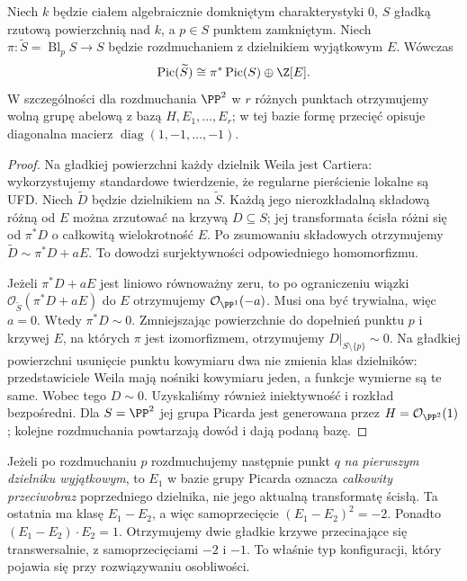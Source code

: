 \begin{stwierdzenie}
\label{st:ga6-pic-blowup}
Niech $k$ będzie ciałem algebraicznie domkniętym
charakterystyki $0$, $S$ gładką rzutową powierzchnią
nad $k$, a $p\in S$ punktem zamkniętym.
Niech $\pi:\widetilde S=\operatorname{Bl}_pS\to S$
będzie rozdmuchaniem z dzielnikiem wyjątkowym $E$.
Wówczas
\[
 \operatorname{Pic}(\widetilde S)\cong
 \pi^*\operatorname{Pic}(S)\oplus\Z[E].
\]
W szczególności dla rozdmuchania $\PP^2$ w $r$
różnych punktach otrzymujemy wolną grupę abelową
z bazą $H,E_1,\ldots,E_r$; w tej bazie formę
przecięć opisuje diagonalna macierz
$\operatorname{diag}(1,-1,\ldots,-1)$.
\end{stwierdzenie}
\begin{proof}
Na gładkiej powierzchni każdy dzielnik Weila jest
Cartiera: wykorzystujemy standardowe twierdzenie,
że regularne pierścienie lokalne są UFD. Niech
$\widetilde D$ będzie dzielnikiem na $\widetilde S$.
Każdą jego nierozkładalną składową różną od $E$
można zrzutować na krzywą $D\subseteq S$; jej
transformata ścisła różni się od $\pi^*D$ o
całkowitą wielokrotność $E$. Po zsumowaniu składowych
otrzymujemy $\widetilde D\sim\pi^*D+aE$.
To dowodzi surjektywności odpowiedniego homomorfizmu.

Jeżeli $\pi^*D+aE$ jest liniowo równoważny zeru,
to po ograniczeniu wiązki $\mathcal O_{\widetilde S}(\pi^*D+aE)$
do $E$ otrzymujemy $\mathcal O_{\PP^1}(-a)$.
Musi ona być trywialna, więc $a=0$. Wtedy
$\pi^*D\sim0$. Zmniejszając powierzchnie do
dopełnień punktu $p$ i krzywej $E$, na których
$\pi$ jest izomorfizmem, otrzymujemy $D|_{S\setminus\{p\}}\sim0$.
Na gładkiej powierzchni usunięcie punktu kowymiaru
dwa nie zmienia klas dzielników: przedstawiciele
Weila mają nośniki kowymiaru jeden, a funkcje
wymierne są te same. Wobec tego $D\sim0$.
Uzyskaliśmy również iniektywność i rozkład bezpośredni.
Dla $S=\PP^2$ jej grupa Picarda jest generowana
przez $H=\mathcal O_{\PP^2}(1)$; kolejne rozdmuchania
powtarzają dowód i dają podaną bazę.
\end{proof}

\begin{uwaga}
\label{uw:ga6-infinitely-near}
Jeżeli po rozdmuchaniu $p$ rozdmuchujemy następnie punkt
$q$ \emph{na pierwszym dzielniku wyjątkowym}, to
$E_1$ w bazie grupy Picarda oznacza \emph{całkowity
przeciwobraz} poprzedniego dzielnika, nie jego aktualną
transformatę ścisłą. Ta ostatnia ma klasę $E_1-E_2$,
a więc samoprzecięcie $(E_1-E_2)^2=-2$.
Ponadto $(E_1-E_2)\cdot E_2=1$. Otrzymujemy dwie
gładkie krzywe przecinające się transwersalnie,
z samoprzecięciami $-2$ i $-1$. To właśnie typ
konfiguracji, który pojawia się przy rozwiązywaniu
osobliwości.
\end{uwaga}

